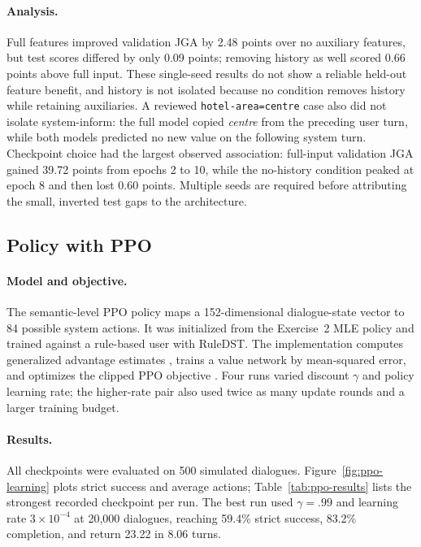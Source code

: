 \documentclass[11pt]{article}
\begin{document}
\paragraph{Analysis.}
Full features improved validation JGA by 2.48 points over no auxiliary
features, but test scores differed by only 0.09 points; removing history as
well scored 0.66 points above full input. These single-seed results do not show
a reliable held-out feature benefit, and history is not isolated because no
condition removes history while retaining auxiliaries. A reviewed
\texttt{hotel-area=centre} case also did not isolate system-inform: the full
model copied \textit{centre} from the preceding user turn, while both models
predicted no new value on the following system turn.
Checkpoint choice had the largest observed association: full-input validation
JGA gained 39.72 points from epochs 2 to 10, while the no-history condition
peaked at epoch 8 and then lost 0.60 points. Multiple seeds are required before
attributing the small, inverted test gaps to the architecture.

\subsection{Policy with PPO}\label{sec:policy}
\paragraph{Model and objective.}
The semantic-level PPO policy maps a 152-dimensional dialogue-state vector to
84 possible system actions. It was initialized from the Exercise~2 MLE policy
and trained against a rule-based user with RuleDST. The implementation computes
generalized advantage estimates \citep{schulman-etal-2016-gae}, trains a value
network by mean-squared error, and optimizes the clipped PPO objective
\citep{schulman-etal-2017-ppo}. Four runs varied discount $\gamma$ and policy
learning rate; the higher-rate pair also used twice as many update rounds and
a larger training budget.

\paragraph{Results.}
All checkpoints were evaluated on 500 simulated dialogues.
Figure~\ref{fig:ppo-learning} plots strict success and average actions;
Table~\ref{tab:ppo-results} lists the strongest recorded checkpoint per run.
The best run used
$\gamma=.99$ and learning rate $3\times10^{-4}$ at 20,000 dialogues, reaching
59.4\% strict success, 83.2\% completion, and return 23.22 in 8.06 turns.
\end{document}
